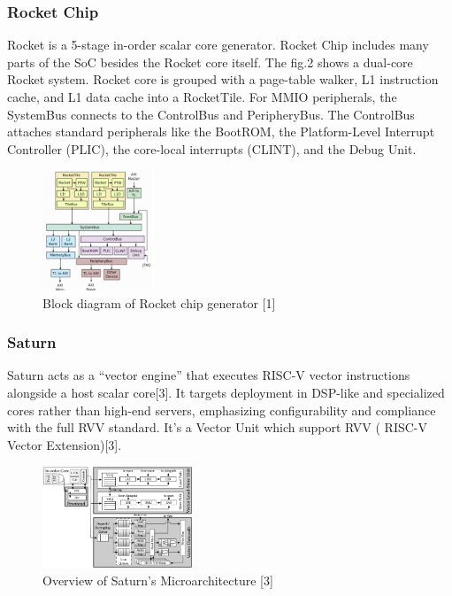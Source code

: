 \documentclass[conference]{IEEEtran}
\begin{document}
\subsubsection{Rocket Chip}
Rocket is a 5-stage in-order scalar core generator. Rocket Chip includes many parts of the SoC besides the Rocket core itself. The fig.2 shows a dual-core Rocket system. Rocket core is grouped with a page-table walker, L1 instruction cache, and L1 data cache into a RocketTile. For MMIO peripherals, the SystemBus connects to the ControlBus and PeripheryBus. The ControlBus attaches standard peripherals like the BootROM, the Platform-Level Interrupt Controller (PLIC), the core-local interrupts (CLINT), and the Debug Unit.
\begin{figure}[htbp]
\centerline{\includegraphics[width=0.3\textwidth]{Rocket chip.png}}
\caption{Block diagram of Rocket chip generator [1]}
\label{fig}
\end{figure}

\subsubsection{Saturn}
Saturn acts as a “vector engine” that executes RISC-V vector instructions alongside a host scalar core[3]. It targets deployment in DSP-like and specialized cores rather than high-end servers, emphasizing configurability 
and compliance with the full RVV standard. It’s a Vector Unit which support RVV ( RISC-V Vector Extension)[3].
\begin{figure}[htbp]
\centerline{\includegraphics[width=0.4\textwidth]{Saturn.png}}
\caption{Overview of Saturn's Microarchitecture [3]}
\label{fig}
\end{figure}
\end{document}
